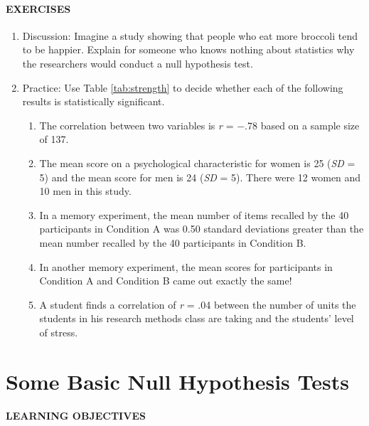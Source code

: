 \documentclass[
]{krantz}
\providecommand{\tightlist}{%
  \setlength{\itemsep}{0pt}\setlength{\parskip}{0pt}}
\begin{document}
\paragraph*{EXERCISES}\label{exercises-28}

\begin{enumerate}
\def\labelenumi{\arabic{enumi}.}
\tightlist
\item
  Discussion: Imagine a study showing that people who eat more broccoli tend to be happier. Explain for someone who knows nothing about statistics why the researchers would conduct a null hypothesis test.
\item
  Practice: Use Table \ref{tab:strength} to decide whether each of the following results is statistically significant.

  \begin{enumerate}
  \def\labelenumii{\alph{enumii}.}
  \tightlist
  \item
    The correlation between two variables is \emph{r} = −.78 based on a sample size of 137.
  \item
    The mean score on a psychological characteristic for women is 25 (\emph{SD} = 5) and the mean score for men is 24 (\emph{SD} = 5). There were 12 women and 10 men in this study.
  \item
    In a memory experiment, the mean number of items recalled by the 40 participants in Condition A was 0.50 standard deviations greater than the mean number recalled by the 40 participants in Condition B.
  \item
    In another memory experiment, the mean scores for participants in Condition A and Condition B came out exactly the same!
  \item
    A student finds a correlation of \emph{r} = .04 between the number of units the students in his research methods class are taking and the students' level of stress.
  \end{enumerate}
\end{enumerate}

\section{Some Basic Null Hypothesis Tests}\label{some-basic-null-hypothesis-tests}

\paragraph*{LEARNING OBJECTIVES}\label{learning-objectives-37}
\end{document}
